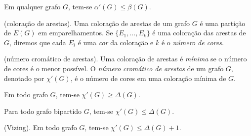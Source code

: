 \documentclass{article}
\begin{document}
\begin{thm}
    Em qualquer grafo \(G\), tem-se \(\alpha'(G) \leq \beta(G)\).
\end{thm}

\begin{defn} (coloração de arestas).
    Uma coloração de arestas de um grafo \(G\) é uma partição de \(E(G)\) em emparelhamentos. Se \(\{E_1, \ldots, E_k\}\) é uma coloração das arestas de \(G\), diremos que cada \(E_i\) é uma \emph{cor} da coloração e \(k\) é o \emph{número de cores}.
\end{defn}

\begin{defn} (número cromático de arestas).
    Uma coloração de arestas é \emph{mínima} se o número de cores é o menor possível. O \emph{número cromático de arestas} de um grafo \(G\), denotado por \(\chi'(G)\), é o número de cores em uma coloração mínima de \(G\).
\end{defn}

\begin{thm}
    Em todo grafo \(G\), tem-se \(\chi'(G) \geq \Delta(G)\).
\end{thm}

\begin{thm}
    Para todo grafo bipartido \(G\), tem-se \(\chi'(G) \leq \Delta(G)\).
\end{thm}

\begin{thm} (Vizing).
    Em todo grafo \(G\), tem-se \(\chi'(G) \leq \Delta(G) + 1\).
\end{thm}
\end{document}
